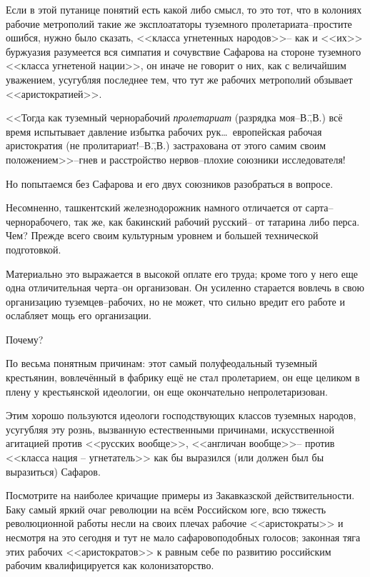 Если в этой путанице понятий есть какой либо смысл, то это тот, что в колониях рабочие метрополий такие же эксплоататоры туземного пролетариата\---простите ошибся, нужно было сказать, <<класса угнетенных народов>>\--- как и <<их>> буржуазия разумеется вся симпатия и сочувствие Сафарова на стороне туземного <<класса угнетеной нации>>, он иначе не говорит о них, как с величайшим уважением, усугубляя последнее тем, что тут же рабочих метрополий обзывает <<аристократией>>.

<<Тогда как туземный чернорабочий \emph{пролетариат} (разрядка моя\---В.\=,В.) всё время испытывает давление избытка рабочих рук\dots\ европейская рабочая аристократия (не пролитариат!\---В.\=,В.) застрахована от этого самим своим положением>>\---гнев и расстройство нервов\---плохие союзники исследователя!

Но попытаемся без Сафарова и его двух союзников разобраться в вопросе.

Несомненно, ташкентский железнодорожник намного отличается от сарта\---чернорабочего, так же, как бакинский рабочий русский\--- от татарина либо перса. Чем? Прежде всего своим культурным уровнем и большей технической подготовкой.

Материально это выражается в высокой оплате его труда; кроме того у него еще одна отличительная черта\---он организован. Он усиленно старается вовлечь в свою организацию туземцев\---рабочих, но не может, что сильно вредит его работе и ослабляет мощь его организации.

Почему?

По весьма понятным причинам: этот самый полуфеодальный туземный крестьянин, вовлечённый в фабрику ещё не стал пролетарием, он еще целиком в плену у крестьянской идеологии, он еще окончательно непролетаризован.

Этим хорошо пользуются идеологи господствующих классов туземных народов, усугубляя эту рознь, вызванную естественными причинами, искусственной агитацией против <<русских вообще>>, <<англичан вообще>>\--- против <<класса нация \--- угнетатель>> как бы выразился (или должен был бы выразиться) Сафаров.

Посмотрите на наиболее кричащие примеры из Закавказской действительности. Баку самый яркий очаг революции на всём Российском юге, всю тяжесть революционной работы несли на своих плечах рабочие <<аристократы>> и несмотря на это сегодня и тут не мало сафаровоподобных голосов; законная тяга этих рабочих <<аристократов>> к равным себе по развитию российским рабочим квалифицируется как колонизаторство.

